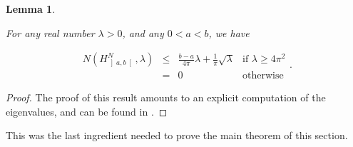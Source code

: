 \documentclass{jams-l}
\newtheorem{lemma}[theorem]{Lemma}
\theoremstyle{definition}
\theoremstyle{remark}
\numberwithin{equation}{section}
\begin{document}
        \begin{lemma}
        \label{LemmaSpectralCountingNeumannEuclidean}
        
            For any real number $\lambda > 0$, and any $0 < a < b$, we have
            
            \[ \begin{array}{llll}
                    N \left( H^N_{\left] a,b \right[}, \lambda \right) & \leqslant &  \frac{b-a}{4 \pi} \lambda + \frac{1}{\pi} \sqrt{\lambda} & \text{if } \lambda \geqslant 4 \pi^2 \\[1em]
                    
                    & = & 0 & \text{otherwise}
                \end{array} . \]
        
        \end{lemma}
        
        \begin{proof}
        
            The proof of this result amounts to an explicit computation of the eigenvalues, and can be found in \cite[Lem 4.1]{MR699488}.
        
        \end{proof}
        
        This was the last ingredient needed to prove the main theorem of this section.
        
\end{document}
